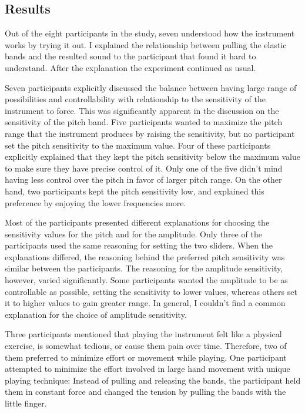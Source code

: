 \documentclass{sigchi}
\begin{document}
\subsection{Results}

Out of the eight participants in the study, seven understood how the instrument works by trying it out.
I explained the relationship between pulling the elastic bands and the resulted sound to the participant that found it hard to understand.
After the explanation the experiment continued as usual.

Seven participants explicitly discussed the balance between having large range of possibilities and controllability with relationship to the sensitivity of the instrument to force.
This was significantly apparent in the discussion on the sensitivity of the pitch band.
Five participants wanted to maximize the pitch range that the instrument produces by raising the sensitivity, but no participant set the pitch sensitivity to the maximum value.
Four of these participants explicitly explained that they kept the pitch sensitivity below the maximum value to make sure they have precise control of it.
Only one of the five didn't mind having less control over the pitch in favor of larger pitch range.
On the other hand, two participants kept the pitch sensitivity low, and explained this preference by enjoying the lower frequencies more.

Most of the participants presented different explanations for choosing the sensitivity values for the pitch and for the amplitude.
Only three of the participants used the same reasoning for setting the two sliders.
When the explanations differed, the reasoning behind the preferred pitch sensitivity was similar between the participants.
The reasoning for the amplitude sensitivity, however, varied significantly.
Some participants wanted the amplitude to be as controllable as possible, setting the sensitivity to lower values, whereas others set it to higher values to gain greater range.
In general, I couldn't find a common explanation for the choice of amplitude sensitivity.

Three participants mentioned that playing the instrument felt like a physical exercise, is somewhat tedious, or cause them pain over time.
Therefore, two of them preferred to minimize effort or movement while playing.
One participant attempted to minimize the effort involved in large hand movement with unique playing technique:
Instead of pulling and releasing the bands, the participant held them in constant force and changed the tension by pulling the bands with the little finger.
\end{document}
